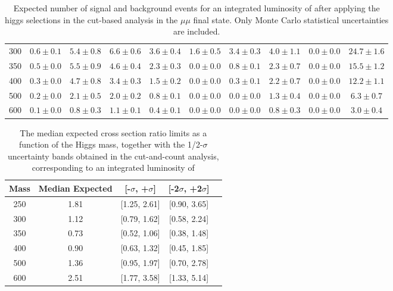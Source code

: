 \begin{table}
{\begin{center}
\begin{tabular}{l | c c |  c c c c c c c }
300 & $0.6\pm0.1$ & $5.4\pm0.8$ & $6.6\pm0.6$ & $3.6\pm0.4$ & $1.6\pm0.5$ & $3.4\pm0.3$ & $4.0\pm1.1$ & $0.0\pm0.0$ & $24.7\pm1.6$ \\ %
350 & $0.5\pm0.0$ & $5.5\pm0.9$ & $4.6\pm0.4$ & $2.3\pm0.3$ & $0.0\pm0.0$ & $0.8\pm0.1$ & $2.3\pm0.7$ & $0.0\pm0.0$ & $15.5\pm1.2$ \\ %
400 & $0.3\pm0.0$ & $4.7\pm0.8$ & $3.4\pm0.3$ & $1.5\pm0.2$ & $0.0\pm0.0$ & $0.3\pm0.1$ & $2.2\pm0.7$ & $0.0\pm0.0$ & $12.2\pm1.1$ \\ %
500 & $0.2\pm0.0$ & $2.1\pm0.5$ & $2.0\pm0.2$ & $0.8\pm0.1$ & $0.0\pm0.0$ & $0.0\pm0.0$ & $1.3\pm0.4$ & $0.0\pm0.0$ & $6.3\pm0.7$ \\ %
600 & $0.1\pm0.0$ & $0.8\pm0.3$ & $1.1\pm0.1$ & $0.4\pm0.1$ & $0.0\pm0.0$ & $0.0\pm0.0$ & $0.8\pm0.3$ & $0.0\pm0.0$ & $3.0\pm0.4$ \\ %
\hline
\end{tabular}
\label{tab:yield_cutbased_mm}
\end{center}
}
\caption{Expected number of signal and background events for an 
  integrated luminosity of \intlumi after applying the higgs selections in the cut-based analysis in the $\mu\mu$ final state. 
  Only Monte Carlo statistical uncertainties are included. }
\end{table}

\begin{table}
\begin{center}
\begin{tabular}{ccccc}
\hline
 Mass & Median Expected & [-$\sigma$, +$\sigma$] & [-2$\sigma$, +2$\sigma$]\\\hline
 250 & 1.81 & [1.25, 2.61] & [0.90, 3.65] \\
300 & 1.12 & [0.79, 1.62] & [0.58, 2.24] \\
350 & 0.73 & [0.52, 1.06] & [0.38, 1.48] \\
400 & 0.90 & [0.63, 1.32] & [0.45, 1.85] \\
500 & 1.36 & [0.95, 1.97] & [0.70, 2.78] \\
600 & 2.51 & [1.77, 3.58] & [1.33, 5.14] \\
\hline
\end{tabular}
\end{center}
\label{tab:limits_cutbased_2fb}
\caption{\fixme The median expected cross section ratio limits as a function 
of the Higgs mass, together with the 1/2-$\sigma$ uncertainty bands obtained in the cut-and-count analysis, corresponding to 
an integrated luminosity of \intlumi}
\end{table}

